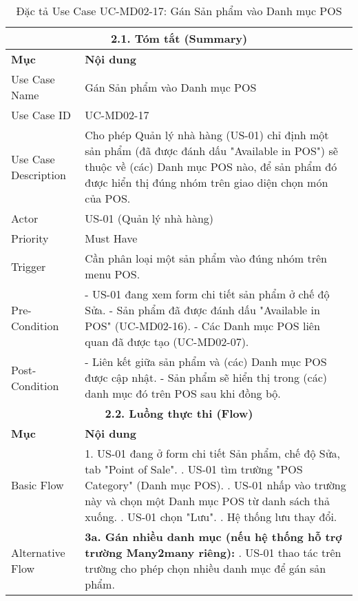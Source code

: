 \begin{longtable}{|m{4cm}|p{11cm}|}
\caption{Đặc tả Use Case UC-MD02-17: Gán Sản phẩm vào Danh mục POS} \label{tab:uc_md02_17_revised} \\
\hline
\multicolumn{2}{|c|}{\textbf{2.1. Tóm tắt (Summary)}} \\
\hline
\textbf{Mục} & \textbf{Nội dung} \\
\hline
\endhead %
\hline
\endfoot %
\hline
\endlastfoot %
Use Case Name & Gán Sản phẩm vào Danh mục POS \\
\hline
Use Case ID & UC-MD02-17 \\
\hline
Use Case Description & Cho phép Quản lý nhà hàng (US-01) chỉ định một sản phẩm (đã được đánh dấu "Available in POS") sẽ thuộc về (các) Danh mục POS nào, để sản phẩm đó được hiển thị đúng nhóm trên giao diện chọn món của POS. \\
\hline
Actor & US-01 (Quản lý nhà hàng) \\
\hline
Priority & Must Have \\
\hline
Trigger & Cần phân loại một sản phẩm vào đúng nhóm trên menu POS. \\
\hline
Pre-Condition & - US-01 đang xem form chi tiết sản phẩm ở chế độ Sửa. \newline - Sản phẩm đã được đánh dấu "Available in POS" (UC-MD02-16). \newline - Các Danh mục POS liên quan đã được tạo (UC-MD02-07). \\
\hline
Post-Condition & - Liên kết giữa sản phẩm và (các) Danh mục POS được cập nhật. \newline - Sản phẩm sẽ hiển thị trong (các) danh mục đó trên POS sau khi đồng bộ. \\
\hline
\multicolumn{2}{|c|}{\textbf{2.2. Luồng thực thi (Flow)}} \\
\hline
\textbf{Mục} & \textbf{Nội dung} \\
\hline
Basic Flow & 1. US-01 đang ở form chi tiết Sản phẩm, chế độ Sửa, tab "Point of Sale". \newline 2. US-01 tìm trường "POS Category" (Danh mục POS). \newline 3. US-01 nhấp vào trường này và chọn một Danh mục POS từ danh sách thả xuống. \newline 4. US-01 chọn "Lưu". \newline 5. Hệ thống lưu thay đổi. \\
\hline
Alternative Flow & \textbf{3a. Gán nhiều danh mục (nếu hệ thống hỗ trợ trường Many2many riêng):} \newline    1. US-01 thao tác trên trường cho phép chọn nhiều danh mục để gán sản phẩm. \\

\end{longtable}
